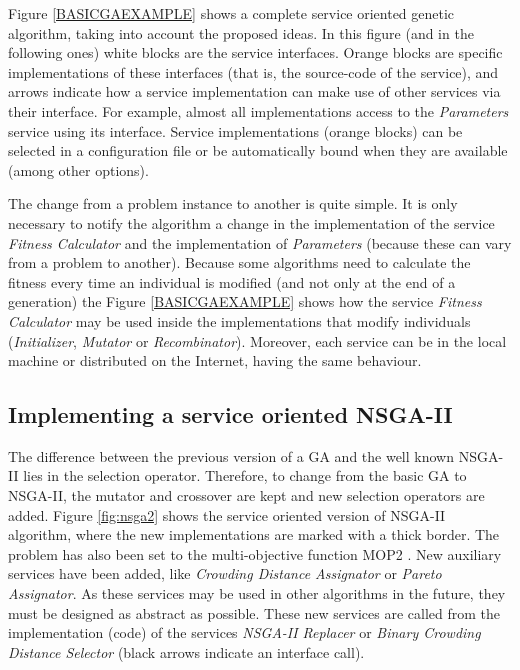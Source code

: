 Figure \ref{BASICGAEXAMPLE} shows a complete service oriented genetic algorithm, taking into account the proposed ideas. In this figure (and in the following ones) white blocks are the service interfaces. Orange blocks are specific implementations of these interfaces (that is, the source-code of the service), and  arrows indicate how a service implementation can make use of other services via their interface. For example, almost all implementations access to the {\em Parameters} service using its interface. Service implementations (orange blocks) can be selected in a configuration file or be automatically bound when they are available (among other options).

 The change from a problem instance to another is quite simple. It is only necessary to notify the algorithm a change in the implementation of the service {\em Fitness Calculator} and the implementation of {\em Parameters} (because these can vary from a problem to another). Because some algorithms need to calculate the fitness every time an individual is modified (and not only at the end of a generation) the Figure \ref{BASICGAEXAMPLE} shows how the service {\em Fitness Calculator} may be used inside the implementations that modify individuals ({\em Initializer}, {\em Mutator} or {\em Recombinator}). Moreover, each service can be in the local machine or distributed on the Internet, having the same behaviour.

\subsection{Implementing a service oriented NSGA-II}
\label{sec:nsga2}

The difference between the previous version of a GA and the well known NSGA-II \cite{NSGA2} lies in the selection operator. Therefore, to change from the basic GA to NSGA-II, the mutator and crossover are kept and new selection operators are added. Figure \ref{fig:nsga2} shows the service oriented version of NSGA-II algorithm, where the new implementations are marked with a thick border. The problem has also been set to the multi-objective function MOP2 \cite{ReviewMultiobj06}. New auxiliary services have been added, like {\em Crowding Distance Assignator} or {\em Pareto Assignator}. As these services may be used in other algorithms in the future, they must be designed as abstract as possible. These new services are called from the implementation (code) of the services {\em NSGA-II Replacer} or {\em Binary Crowding Distance Selector} (black arrows indicate an interface call). 




